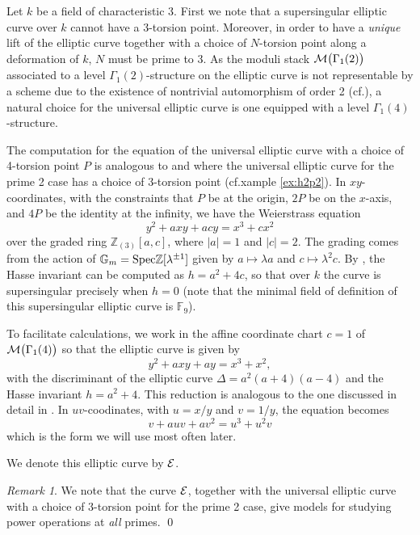 \documentclass{gtpart}
\theoremstyle{definition}
\theoremstyle{remark}
\newtheorem{rmk}[thm]{Remark}
\newcommand{\mb}[1]{\mathbb{#1}}
\newcommand{\Spec}{{\rm Spec}}
\newcommand{\Gm}{{{\mb G}_m}}
\newcommand{\cff}[2]{cf.\thinspace{\cite[#1]{#2}}}
\begin{document}
Let $k$ be a field of characteristic 3.  First we note that a supersingular 
elliptic curve over $k$ cannot have a 3-torsion point.  Moreover, in order to 
have a {\em unique} lift of the elliptic curve together with a choice of 
$N$-torsion point along a deformation of $k$, $N$ must be prime to 3.  As the 
moduli stack ${\cal M}\big(\Gamma_1(2)\big)$ associated to a level 
$\Gamma_1(2)$-structure on the elliptic curve is not representable by a scheme 
due to the existence of nontrivial automorphism of order 2 
(\cff{corollaries 4.7.2 and 2.7.2}{katzmazur}), a natural choice for the 
universal elliptic curve is one equipped with a level $\Gamma_1(4)$-structure.  

The computation for the equation of the universal elliptic curve with a choice 
of 4-torsion point $P$ is analogous to \cite[2.2.10]{katzmazur} and 
\cite[proposition 3.2]{tmf3} where the universal elliptic curve for the prime 
2 case has a choice of 3-torsion point (cf.xample \ref{ex:h2p2}).  
In $xy$-coordinates, with the constraints that $P$ be at the origin, $2P$ be 
on the $x$-axis, and $4P$ be the identity at the infinity, we have the 
Weierstrass equation 
\[
 y^2 + a x y + a c y = x^3 + c x^2 
\]
over the graded ring ${\mb Z}_{(3)}[a,c]$, where $|a| = 1$ and $|c| = 2$.  The 
grading comes from the action of $\Gm = \Spec {\mb Z}[\lambda^{\pm1}]$ given 
by $a \mapsto \lambda a$ and $c \mapsto \lambda^2 c$.  By 
\cite[V.4.1(a)]{AEC}, the Hasse invariant can be computed as $h = a^2 + 4c$, 
so that over $k$ the curve is supersingular precisely when $h = 0$ (note that 
the minimal field of definition of this supersingular elliptic curve is 
${\mb F}_9$).  

To facilitate calculations, we work in the affine coordinate chart $c = 1$ of 
${\cal M}\big(\Gamma_1(4)\big)$ so that the elliptic curve is given by 
\[
 y^2 + a x y + a y = x^3 + x^2, 
\]
with the discriminant of the elliptic curve $\Delta = a^2(a + 4)(a - 4)$ and 
the Hasse invariant $h = a^2 + 4$.  This reduction is analogous to the one 
discussed in detail in \cite[section 4]{level3}.  In $uv$-coodinates, with 
$u = x/y$ and $v = 1/y$, the equation becomes 
\[
 v + a u v + a v^2 = u^3 + u^2 v 
\]
which is the form we will use most often later.  

We denote this elliptic curve by $\cal E$.  
\begin{rmk}
 We note that the curve $\cal E$, together with the universal elliptic curve 
 with a choice of 3-torsion point for the prime 2 case, give models for 
 studying power operations at {\em all} primes.  \qed
\end{rmk}
\end{document}
